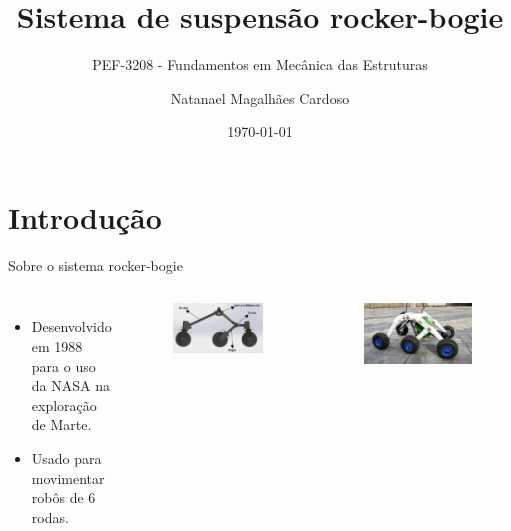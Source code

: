 \documentclass[11pt]{beamer}
\title{Sistema de suspensão rocker-bogie} %
\subtitle{PEF-3208 - Fundamentos em Mecânica das Estruturas}  %
\date{\today} %
\author[Natanael M. Cardoso]{Natanael Magalhães Cardoso}
\institute{Escola Politécnica - Universidade de São Paulo}
\begin{document}
\maketitle

\section{Introdução}

\begin{frame}{Sobre o sistema rocker-bogie}
  \begin{columns}
    \begin{itemize}
      \item Desenvolvido em 1988 para o uso da NASA na exploração de Marte.
      \item Usado para movimentar robôs de 6 rodas.
    \end{itemize}
    \begin{figure}[ht]
      \centering
      \includegraphics[width=.9\textwidth]{fig/rb-suspension.png}
    \end{figure}
    \vspace{5mm}
    \begin{figure}[ht]
      \centering
      \includegraphics[width=.9\textwidth]{fig/rb.jpg}
    \end{figure}
  \end{columns}
\end{frame}
\end{document}
